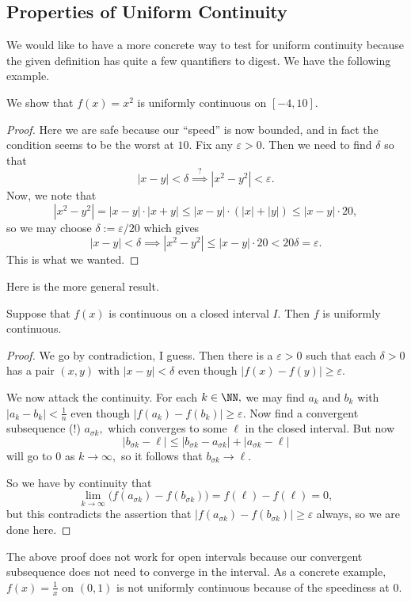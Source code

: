 \subsection{Properties of Uniform Continuity}
We would like to have a more concrete way to test for uniform continuity because the given definition has quite a few quantifiers to digest. We have the following example.
\begin{exercise}
	We show that $f(x)=x^2$ is uniformly continuous on $[-4,10].$
\end{exercise}
\begin{proof}
	Here we are safe because our ``speed'' is now bounded, and in fact the condition seems to be the worst at $10.$ Fix any $\varepsilon>0.$ Then we need to find $\delta$ so that
	\[|x-y|<\delta\stackrel?\implies\left|x^2-y^2\right|<\varepsilon.\]
	Now, we note that
	\[\left|x^2-y^2\right|=|x-y|\cdot|x+y|\le|x-y|\cdot(|x|+|y|)\le|x-y|\cdot20,\]
	so we may choose $\delta:=\varepsilon/20$ which gives
	\[|x-y|<\delta\implies\left|x^2-y^2\right|\le|x-y|\cdot20<20\delta=\varepsilon.\]
	This is what we wanted.
\end{proof}
Here is the more general result.
\begin{theorem}
	Suppose that $f(x)$ is continuous on a closed interval $I.$ Then $f$ is uniformly continuous.
\end{theorem}
\begin{proof}
	We go by contradiction, I guess. Then there is a $\varepsilon>0$ such that each $\delta>0$ has a pair $(x,y)$ with $|x-y|<\delta$ even though $|f(x)-f(y)|\ge\varepsilon.$

	We now attack the continuity. For each $k\in\NN,$ we may find $a_k$ and $b_k$ with $|a_k-b_k|<\frac1n$ even though $|f(a_k)-f(b_k)|\ge\varepsilon.$ Now find a convergent subsequence (!) $a_{\sigma k},$ which converges to some $\ell$ in the closed interval. But now
	\[|b_{\sigma k}-\ell|\le|b_{\sigma k}-a_{\sigma k}|+|a_{\sigma k}-\ell|\]
	will go to $0$ as $k\to\infty,$ so it follows that $b_{\sigma k}\to\ell.$

	So we have by continuity that
	\[\lim_{k\to\infty}\big(f(a_{\sigma k})-f(b_{\sigma k})\big)=f(\ell)-f(\ell)=0,\]
	but this contradicts the assertion that $|f(a_{\sigma k})-f(b_{\sigma k})|\ge\varepsilon$ always, so we are done here.
\end{proof}
\begin{remark}
	The above proof does not work for open intervals because our convergent subsequence does not need to converge in the interval. As a concrete example, $f(x)=\frac1x$ on $(0,1)$ is not uniformly continuous because of the speediness at $0.$
\end{remark}

